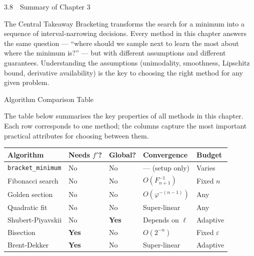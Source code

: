 \documentclass[aspectratio=169,10pt]{beamer}
\begin{document}
\begin{frame}[allowframebreaks]{3.8\ \ Summary of Chapter 3}
  \begin{alertblock}{The Central Takeaway}
    Bracketing transforms the search for a minimum into a sequence of
    interval-narrowing decisions.  Every method in this chapter answers the
    same question --- ``where should we sample next to learn the most about
    where the minimum is?'' --- but with different assumptions and different
    guarantees.  Understanding the assumptions (unimodality, smoothness,
    Lipschitz bound, derivative availability) is the key to choosing the
    right method for any given problem.
  \end{alertblock}

\end{frame}

\begin{frame}[allowframebreaks]{Algorithm Comparison Table}

  The table below summarises the key properties of all methods in this chapter.
  Each row corresponds to one method; the columns capture the most important
  practical attributes for choosing between them.

  \begin{center}
    \begin{tabular}{@{}lllll@{}}
      \toprule
      Algorithm & Needs $f'$? & Global? & Convergence & Budget \\
      \midrule
      \texttt{bracket\_minimum} & No & No & --- (setup only) & Varies \\
      Fibonacci search          & No & No & $O(F_{n+1}^{-1})$ & Fixed $n$ \\
      Golden section            & No & No & $O(\varphi^{-(n-1)})$ & Any \\
      Quadratic fit             & No & No & Super-linear & Any \\
      Shubert-Piyavskii         & No & \textbf{Yes} & Depends on $\ell$ & Adaptive \\
      Bisection                 & \textbf{Yes} & No & $O(2^{-n})$ & Fixed $\varepsilon$ \\
      Brent-Dekker              & \textbf{Yes} & No & Super-linear & Adaptive \\
      \bottomrule
    \end{tabular}
  \end{center}


\end{frame}
\end{document}
